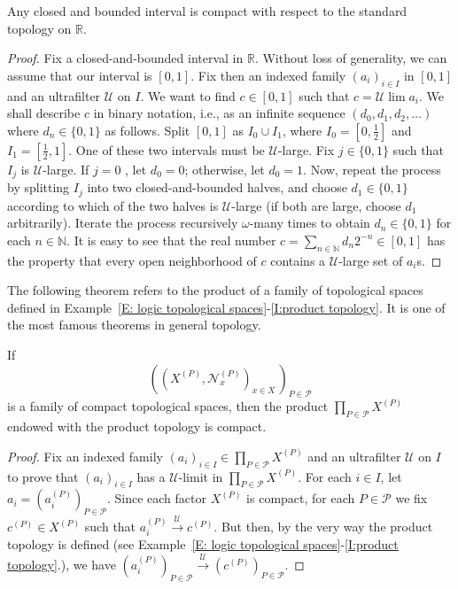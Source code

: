 \documentclass{scrartcl}
\newcommand{\SP}{\mathscr{P}}
\newcommand{\SU}{\mathscr{U}}
\begin{document}
\begin{proposition}
\label{P:Heine-Borel}
Any closed and bounded interval is compact with respect to the standard topology on $\mathbb{R}$.
\end{proposition}

 \begin{proof}
Fix a closed-and-bounded interval in $\mathbb{R}$. Without loss of generality, we can assume that our interval is $[0,1]$. Fix then an indexed family $(a_i)_{i\in I}$ in $[0,1]$ and an ultrafilter $\mathscr{U}$ on $I$. We want to find $c\in [0,1]$ such that $c=\mathscr{U}\lim a_i$. We shall describe $c$ in binary notation, i.e., as an infinite sequence $(d_0,d_1,d_2,\dots)$ where $d_n\in\{0,1\}$ as follows. Split $[0,1]$ as $I_0\cup I_1$, where $I_0=[0,\frac12]$ and $I_1=[\frac12,1]$. One of these two intervals must be $\mathscr{U}$-large. Fix $j\in\{0,1\}$  such that $I_j$ is $\mathscr{U}$-large. If $j=0$ , let $d_0=0$; otherwise, let $d_0=1$. Now, repeat the process by splitting $I_j$ into two closed-and-bounded halves, and choose $d_1\in\{0,1\}$ according to which of the two halves is $\mathscr{U}$-large (if both are large, choose $d_1$ arbitrarily). Iterate the process recursively $\omega$-many times to obtain $d_n\in\{0,1\}$ for each $n\in\mathbb{N}$. It is easy to see that the real number $c=\sum_{n\in\mathbb{N}}d_n2^{-n}\in[0,1]$ has the property that every open neighborhood of $c$ contains a $\mathscr{U}$-large set of $a_i$s.
\end{proof}

The following theorem refers to the product of a family of topological spaces defined in Example~\ref{E: logic topological spaces}-\ref{I:product topology}.  It is one of the most famous theorems in general topology.

\begin{theorem}
\label{T:Tychonov}
If
\[
\left( (X^{(P)},\mathscr{N}_x^{(P)})_{x\in X} \, \right)_{P\in \SP}
\]
is a family of compact topological spaces, then the product $\prod_{P\in\SP}X^{(P)}$  endowed with the product topology is compact.
\end{theorem}

\begin{proof}
Fix an indexed family  $(a_i)_{i\in I }\in \prod_{P\in\SP}X^{(P)}$ and an ultrafilter  $\SU$ on $I$ to prove that $(a_i)_{i\in I }$ has a $\SU$-limit in $\prod_{P\in\SP}X^{(P)}$. 
For each $i\in I$, let $a_i= (a_i^{(P)})_{P\in\SP}$. 
Since each factor $X^{(P)}$ is compact,  for each $P\in \SP$ we fix $c^{(P)}\in X^{(P)}$ such that $a_i^{(P)}\overset{\mathscr{U}}\to c^{(P)}$. But then, by the very way the product topology is defined (see  Example~\ref{E: logic topological spaces}-\ref{I:product topology}.), we have $(a_i^{(P)})_{P\in\SP}\overset{\mathscr{U}}\to (c^{(P)})_{P\in\SP}$.
\end{proof}
\end{document}
